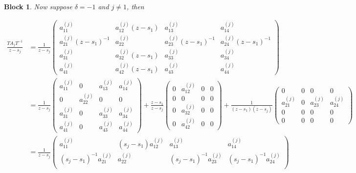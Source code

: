 \documentclass[12pt]{article}
\newtheorem{block}{Block}
\begin{document}
\begin{block}
Now suppose $\delta = -1$ and $j\ne 1$, then


\[
\begin{aligned}
    \frac{T A_j T^{-1}}{z-s_j} &= \frac{1}{z-s_j}
    \begin{pmatrix}
        a_{11}^{(j)} & a_{12}^{(j)} (z-s_1) & a_{13}^{(j)} & a_{14}^{(j)} \\[10pt]
        a_{21}^{(j)}(z-s_1)^{-1} & a_{22}^{(j)} & a_{23}^{(j)} (z-s_1)^{-1} & a_{24}^{(j)} (z-s_1)^{-1}\\[10pt]
        a_{31}^{(j)} & a_{32}^{(j)} (z-s_1) & a_{33}^{(j)} & a_{34}^{(j)} \\[10pt]
        a_{41}^{(j)} & a_{42}^{(j)} (z-s_1) & a_{43}^{(j)} & a_{44}^{(j)}
    \end{pmatrix} \\[10pt] &=
    \frac{1}{z-s_j}
    \begin{pmatrix}
        a_{11}^{(j)} & 0 & a_{13}^{(j)} & a_{14}^{(j)} \\[10pt]
        0 & a_{22}^{(j)} & 0 & 0\\[10pt]
        a_{31}^{(j)} & 0 & a_{33}^{(j)} & a_{34}^{(j)} \\[10pt]
        a_{41}^{(j)} & 0 & a_{43}^{(j)} & a_{44}^{(j)}
    \end{pmatrix}
    +\frac{ z-s_1 }{z-s_j}
    \begin{pmatrix}
        0 & a_{12}^{(j)} & 0 & 0 \\[10pt]
        0 & 0 & 0 & 0 \\[10pt]
        0 & a_{32}^{(j)} & 0 & 0 \\[10pt]
        0 & a_{42}^{(j)} & 0 & 0
    \end{pmatrix}
    +\frac{1}{(z-s_1)(z-s_j)}
    \begin{pmatrix}
        0 & 0 & 0 & 0 \\[10pt]
        a_{21}^{(j)} & 0 & a_{23}^{(j)}  & a_{24}^{(j)}\\[10pt]
        0 & 0 & 0 & 0 \\[10pt]
        0 & 0 & 0 & 0
    \end{pmatrix}
    \\[10pt] &=
    \frac{1}{z-s_j}
    \begin{pmatrix}
        a_{11}^{(j)} & (s_j-s_1)a_{12}^{(j)} & a_{13}^{(j)} & a_{14}^{(j)} \\[10pt]
        (s_j-s_1)^{-1} a_{21}^{(j)} & a_{22}^{(j)} & (s_j-s_1)^{-1} a_{23}^{(j)} & (s_j-s_1)^{-1} a_{24}^{(j)}\\[10pt]

\end{pmatrix}
\end{aligned}\]
\end{block}
\end{document}
